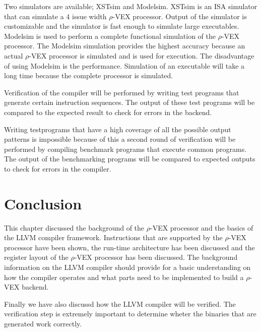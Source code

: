 Two simulators are available; XSTsim and Modelsim. XSTsim is an ISA simulator that can simulate a 4 issue width $\rho$-VEX processor. Output of the simulator is customizable and the simulator is fast enough to simulate large executables. Modelsim is used to perform a complete functional simulation of the $\rho$-VEX processor. The Modelsim simulation provides the highest accuracy because an actual $\rho$-VEX processor is simulated and is used for execution. The disadvantage of using Modelsim is the performance. Simulation of an executable will take a long time because the complete processor is simulated.

Verification of the compiler will be performed by writing test programs that generate certain instruction sequences. The output of these test programs will be compared to the expected result to check for errors in the backend.

Writing testprograms that have a high coverage of all the possible output patterns is impossible because of this a second round of verification will be performed by compiling benchmark programs that execute common programs. The output of the benchmarking programs will be compared to expected outputs to check for errors in the compiler.

\section{Conclusion}
This chapter discussed the background of the $\rho$-VEX processor and the basics of the LLVM compiler framework. Instructions that are supported by the $\rho$-VEX processor have been shown, the run-time architecture has been discussed and the register layout of the $\rho$-VEX processor has been discussed. The background information on the LLVM compiler should provide for a basic understanding on how the compiler operates and what parts need to be implemented to build a $\rho$-VEX backend.

Finally we have also discussd how the LLVM compiler will be verified. The verification step is extremely important to determine wheter the binaries that are generated work correctly.

\acresetall
